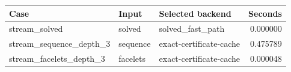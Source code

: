 {\small
\begin{tabular}{lllr}
\hline
Case & Input & Selected backend & Seconds \\
\hline
stream\_solved & solved & solved\_fast\_path & 0.000000 \\
stream\_sequence\_depth\_3 & sequence & exact-certificate-cache & 0.475789 \\
stream\_facelets\_depth\_3 & facelets & exact-certificate-cache & 0.000048 \\
\hline
\end{tabular}
}
